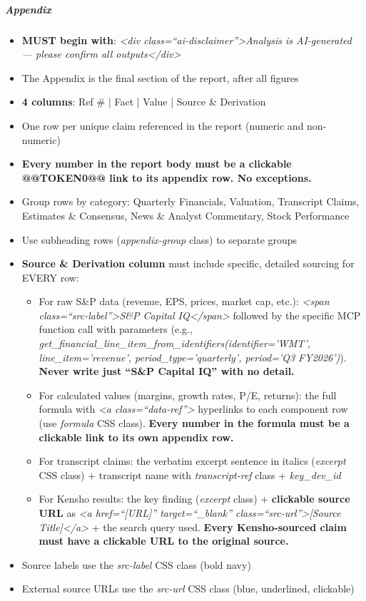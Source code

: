 \documentclass[11pt]{article}
\begin{document}
\subparagraph{Appendix}\mbox{}\par
\begin{itemize}[leftmargin=*,itemsep=2pt,topsep=2pt]
\item {} \textbf{MUST begin with}: \emph{<div class=``ai-disclaimer''>Analysis is AI-generated — please confirm all outputs</div>}
\item {} The Appendix is the final section of the report, after all figures
\item {} \textbf{4 columns}: Ref \# | Fact | Value | Source \& Derivation
\item {} One row per unique claim referenced in the report (numeric and non-numeric)
\item {} \textbf{Every number in the report body must be a clickable @@TOKEN0@@ link to its appendix row. No exceptions.}
\item {} Group rows by category: Quarterly Financials, Valuation, Transcript Claims, Estimates \& Consensus, News \& Analyst Commentary, Stock Performance
\item {} Use subheading rows (\emph{appendix-group} class) to separate groups
\item {} \textbf{Source \& Derivation column} must include specific, detailed sourcing for EVERY row:
\begin{itemize}[leftmargin=*,itemsep=2pt,topsep=2pt]
\item {} For raw S\&P data (revenue, EPS, prices, market cap, etc.): \emph{<span class=``src-label''>S\&P Capital IQ</span>} followed by the specific MCP function call with parameters (e.g., \emph{get\_\allowbreak{}financial\_\allowbreak{}line\_\allowbreak{}item\_\allowbreak{}from\_\allowbreak{}identifiers(identifier='WMT', line\_\allowbreak{}item='revenue', period\_\allowbreak{}type='quarterly', period='Q3 FY2026')}). \textbf{Never write just ``S\&P Capital IQ'' with no detail.}
\item {} For calculated values (margins, growth rates, P/E, returns): the full formula with \emph{<a class=``data-ref''>} hyperlinks to each component row (use \emph{formula} CSS class). \textbf{Every number in the formula must be a clickable link to its own appendix row.}
\item {} For transcript claims: the verbatim excerpt sentence in italics (\emph{excerpt} CSS class) + transcript name with \emph{transcript-ref} class + \emph{key\_\allowbreak{}dev\_\allowbreak{}id}
\item {} For Kensho results: the key finding (\emph{excerpt} class) + \textbf{clickable source URL} as \emph{<a href=``[URL]'' target=``\_\allowbreak{}blank'' class=``src-url''>[Source Title]</a>} + the search query used. \textbf{Every Kensho-sourced claim must have a clickable URL to the original source.}
\end{itemize}
\item {} Source labels use the \emph{src-label} CSS class (bold navy)
\item {} External source URLs use the \emph{src-url} CSS class (blue, underlined, clickable)
\end{itemize}
\end{document}
